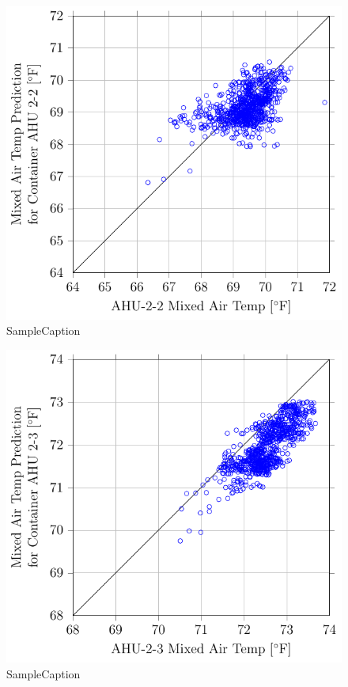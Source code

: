 \begin{figure}
\centering
\includegraphics[]{Plots/2016-09-07-1619-MixedAirTempPredictionforContainerAHU22vsAHU22MixedAirTemp.pdf}
\caption{SampleCaption}
\label{fig:2016-09-07-1619-MixedAirTempPredictionforContainerAHU22vsAHU22MixedAirTemp}
\end{figure}

\begin{figure}
\centering
\includegraphics[]{Plots/2016-09-07-1623-MixedAirTempPredictionforContainerAHU23vsAHU23MixedAirTemp.pdf}
\caption{SampleCaption}
\label{fig:2016-09-07-1623-MixedAirTempPredictionforContainerAHU23vsAHU23MixedAirTemp}
\end{figure}


